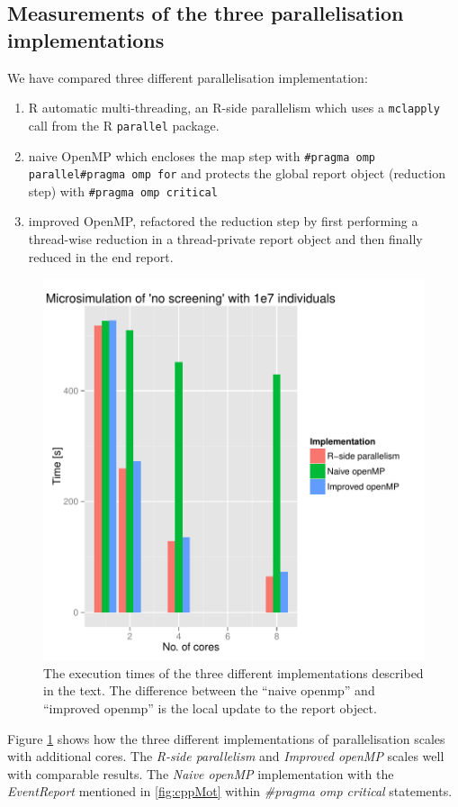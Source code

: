 \subsection{Measurements of the three parallelisation implementations}

We have compared three different parallelisation implementation: 
\begin{enumerate}
\item R automatic multi-threading, an R-side parallelism which uses a \texttt{mclapply} call from the R
  \texttt{parallel} package.
\item naive OpenMP which encloses the map step with \texttt{\#pragma omp parallel\#pragma
    omp for} and protects the global report object (reduction step) with \texttt{\#pragma omp critical}
\item improved OpenMP, refactored the reduction step by first
  performing a thread-wise reduction in a thread-private report object and then
  finally reduced in the end report.
\end{enumerate}
\begin{figure}[!htbp] \centering
  \includegraphics[height=0.5\textheight]{images/implementationProfiling.pdf}
  \caption{The execution times of the three different implementations
    described in the text. The difference between the ``naive openmp''
  and ``improved openmp'' is the local update to the report
  object.}
  \label{fig:implScaling}
\end{figure} 
Figure \ref{fig:implScaling} shows how the three
different implementations of parallelisation scales with additional
cores. The \emph{R-side parallelism} and \emph{Improved openMP} scales
well with comparable results. The \emph{Naive openMP} implementation
with the \emph{EventReport} mentioned in \ref{fig:cppMot} within
\emph{\#pragma omp critical} statements. 

